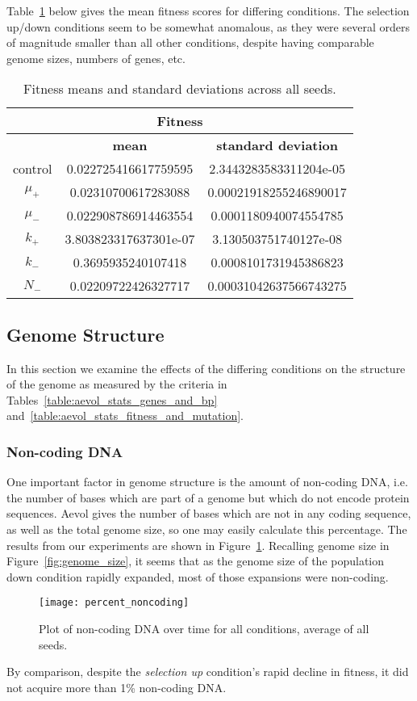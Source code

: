 Table~\ref{table:fitness_means_std_dev} below gives the mean fitness scores for differing conditions. The selection up/down conditions seem to be somewhat anomalous, as they were several orders of magnitude smaller than all other conditions, despite having comparable genome sizes, numbers of genes, etc.
\begin{table}[H]
	\centering
	\begin{tabular}{|c||c|c|}
		\hline
		\multicolumn{3}{c}{\Large \textbf{Fitness}} \\
		\hline
		& \textbf{mean} & \textbf{standard deviation} \\
		\hline \hline
		control & 0.022725416617759595 & 2.3443283583311204e-05 \\
		\hline
		$\mu_+$ & 0.02310700617283088 & 0.00021918255246890017 \\
		\hline
		$\mu_-$ & 0.022908786914463554 & 0.0001180940074554785 \\
		\hline
		$k_+$ & 3.803823317637301e-07 & 3.130503751740127e-08 \\
		\hline
		$k_-$ & 0.3695935240107418	& 0.0008101731945386823 \\
		\hline
		$N_-$ & 0.02209722426327717 & 0.00031042637566743275 \\
		\hline
	\end{tabular}
	\caption[Fitness means and standard deviations.]{Fitness means and standard deviations across all seeds. }
	\label{table:fitness_means_std_dev}
\end{table}

\subsection{Genome Structure}
In this section we examine the effects of the differing conditions on the structure of the genome as measured by the criteria in Tables~\ref{table:aevol_stats_genes_and_bp} and~\ref{table:aevol_stats_fitness_and_mutation}. 

\subsubsection{Non-coding DNA}
One important factor in genome structure is the amount of non-coding DNA, i.e. the number of bases which are part of a genome but which do not encode protein sequences. Aevol gives the number of bases which are not in any coding sequence, as well as the total genome size, so one may easily calculate this percentage. The results from our experiments are shown in Figure~\ref{fig:mean_non-coding_DNA}. Recalling genome size in Figure~\ref{fig:genome_size}, it seems that as the genome size of the population down condition rapidly expanded, most of those expansions were non-coding.
\begin{figure}[H]
	\centering
	\texttt{[image: percent\_noncoding]}
	\caption[Non-coding DNA]{Plot of non-coding DNA over time for all conditions, average of all seeds.}
	\label{fig:mean_non-coding_DNA}
\end{figure}
By comparison, despite the \textit{selection up} condition's rapid decline in fitness, it did not acquire more than 1\% non-coding DNA. 

